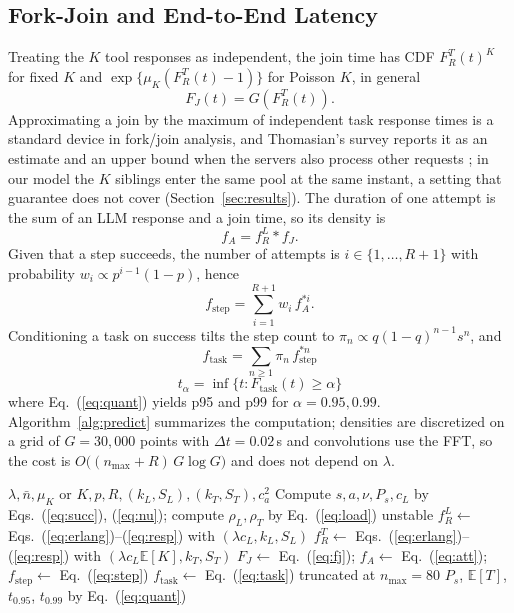\documentclass[journal]{IEEEtran}
\newcommand{\E}{\mathbb{E}}
\begin{document}
\subsection{Fork-Join and End-to-End Latency}
Treating the $K$ tool responses as independent, the join time has CDF $F_R^{T}(t)^{K}$ for fixed $K$ and $\exp\{\mu_K(F_R^{T}(t)-1)\}$ for Poisson $K$, in general
\begin{equation}F_J(t)=G\!\left(F_R^{T}(t)\right).\label{eq:fj}\end{equation}
Approximating a join by the maximum of independent task response times is a standard device in fork/join analysis, and Thomasian's survey reports it as an estimate and an upper bound when the servers also process other requests \cite{thomasian2014forkjoin}; in our model the $K$ siblings enter the same pool at the same instant, a setting that guarantee does not cover (Section~\ref{sec:results}). The duration of one attempt is the sum of an LLM response and a join time, so its density is
\begin{equation}f_A=f_R^{L}\ast f_J.\label{eq:att}\end{equation}
Given that a step succeeds, the number of attempts is $i\in\{1,\dots,R+1\}$ with probability $w_i\propto p^{i-1}(1-p)$, hence
\begin{equation}f_{\mathrm{step}}=\sum_{i=1}^{R+1}w_i\,f_A^{\ast i}.\label{eq:step}\end{equation}
Conditioning a task on success tilts the step count to $\pi_n\propto q(1-q)^{n-1}s^n$, and
\begin{equation}f_{\mathrm{task}}=\sum_{n\ge1}\pi_n\,f_{\mathrm{step}}^{\ast n}\label{eq:task}\end{equation}
\begin{equation}t_\alpha=\inf\{t:F_{\mathrm{task}}(t)\ge\alpha\}\label{eq:quant}\end{equation}
where Eq.~(\ref{eq:quant}) yields p95 and p99 for $\alpha=0.95,0.99$. Algorithm~\ref{alg:predict} summarizes the computation; densities are discretized on a grid of $G=30{,}000$ points with $\Delta t=0.02$\,s and convolutions use the FFT, so the cost is $O\big((n_{\max}+R)\,G\log G\big)$ and does not depend on $\lambda$.
\begin{algorithm}[t]
\caption{Semi-analytical latency prediction}\label{alg:predict}
\begin{algorithmic}[1]
\Require $\lambda,\bar n,\mu_K\text{ or }K,p,R,(k_L,S_L),(k_T,S_T),c_a^2$
\State Compute $s,a,\nu,P_s,c_L$ by Eqs.~(\ref{eq:succ}), (\ref{eq:nu}); compute $\rho_L,\rho_T$ by Eq.~(\ref{eq:load})
 \State \Return unstable \EndIf
\State $f_R^{L}\gets$ Eqs.~(\ref{eq:erlang})--(\ref{eq:resp}) with $(\lambda c_L,k_L,S_L)$
\State $f_R^{T}\gets$ Eqs.~(\ref{eq:erlang})--(\ref{eq:resp}) with $(\lambda c_L\E[K],k_T,S_T)$
\State $F_J\gets$ Eq.~(\ref{eq:fj}); $f_A\gets$ Eq.~(\ref{eq:att}); $f_{\mathrm{step}}\gets$ Eq.~(\ref{eq:step})
\State $f_{\mathrm{task}}\gets$ Eq.~(\ref{eq:task}) truncated at $n_{\max}=80$
\State \Return $P_s$, $\E[T]$, $t_{0.95}$, $t_{0.99}$ by Eq.~(\ref{eq:quant})
\end{algorithmic}
\end{algorithm}
\end{document}

